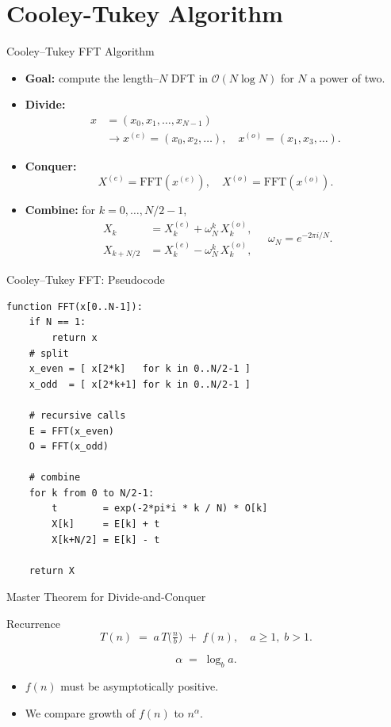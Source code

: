 \documentclass[12pt]{beamer}
\begin{document}
\section{Cooley-Tukey Algorithm}
\begin{frame}{Cooley–Tukey FFT Algorithm}
  \small
  \begin{itemize}
    \item \textbf{Goal:} compute the length–\(N\) DFT in \(\mathcal{O}(N\log N)\) for \(N\) a power of two.
    \item \textbf{Divide:}
      \[
        \begin{split}
          x &= (x_0,x_1,\dots,x_{N-1})\\
            &\rightarrow
              x^{(e)}=(x_0,x_2,\dots),\quad
              x^{(o)}=(x_1,x_3,\dots).
        \end{split}
      \]
    \item \textbf{Conquer:}
      \[
        X^{(e)} = \mathrm{FFT}(x^{(e)}),\quad
        X^{(o)} = \mathrm{FFT}(x^{(o)}).
      \]
    \item \textbf{Combine:} for \(k=0,\dots,N/2-1\),
      \[
        \begin{aligned}
          X_k       &= X^{(e)}_k + \omega_N^k\,X^{(o)}_k,\\
          X_{k+N/2} &= X^{(e)}_k - \omega_N^k\,X^{(o)}_k,
        \end{aligned}
        \quad
        \omega_N=e^{-2\pi i/N}.
      \]
  \end{itemize}
\end{frame}

\begin{frame}[fragile]{Cooley–Tukey FFT: Pseudocode}
  \scriptsize       %
\begin{verbatim}
function FFT(x[0..N-1]):
    if N == 1:
        return x
    # split
    x_even = [ x[2*k]   for k in 0..N/2-1 ]
    x_odd  = [ x[2*k+1] for k in 0..N/2-1 ]

    # recursive calls
    E = FFT(x_even)
    O = FFT(x_odd)

    # combine
    for k from 0 to N/2-1:
        t        = exp(-2*pi*i * k / N) * O[k]
        X[k]     = E[k] + t
        X[k+N/2] = E[k] - t

    return X
\end{verbatim}
\end{frame}


\begin{frame}{Master Theorem for Divide‐and‐Conquer}
  \begin{block}{Recurrence}
    \[
      T(n) \;=\; a\,T\!\bigl(\tfrac{n}{b}\bigr) \;+\; f(n),
      \quad a \ge 1,\; b > 1.
    \]
  \end{block}
  \[
    \alpha \;=\;\log_{b} a.
  \]
  \vspace{1em}
  \begin{itemize}
    \item \(f(n)\) must be asymptotically positive.
    \item We compare growth of \(f(n)\) to \(n^{\alpha}\).
  \end{itemize}
\end{frame}
\end{document}
